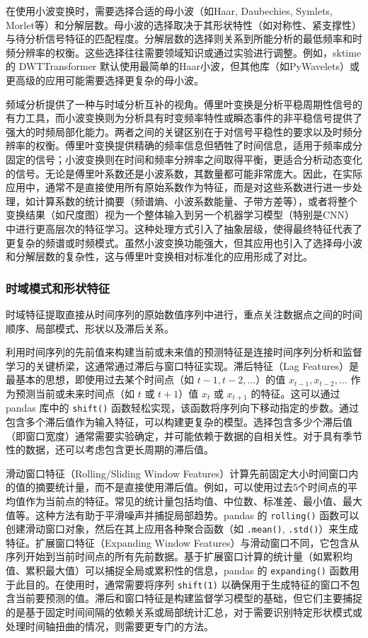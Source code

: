 在使用小波变换时，需要选择合适的母小波（如Haar, Daubechies, Symlets, Morlet等）和分解层数。母小波的选择取决于其形状特性（如对称性、紧支撑性）与待分析信号特征的匹配程度。分解层数的选择则关系到所能分析的最低频率和时频分辨率的权衡。这些选择往往需要领域知识或通过实验进行调整。例如，sktime 的 DWTTransformer 默认使用最简单的Haar小波，但其他库（如PyWavelets）或更高级的应用可能需要选择更复杂的母小波。

频域分析提供了一种与时域分析互补的视角。傅里叶变换是分析平稳周期性信号的有力工具，而小波变换则为分析具有时变频率特性或瞬态事件的非平稳信号提供了强大的时频局部化能力。两者之间的关键区别在于对信号平稳性的要求以及时频分辨率的权衡。傅里叶变换提供精确的频率信息但牺牲了时间信息，适用于频率成分固定的信号；小波变换则在时间和频率分辨率之间取得平衡，更适合分析动态变化的信号。无论是傅里叶系数还是小波系数，其数量都可能非常庞大。因此，在实际应用中，通常不是直接使用所有原始系数作为特征，而是对这些系数进行进一步处理，如计算系数的统计摘要（频谱熵、小波系数能量、子带方差等），或者将整个变换结果（如尺度图）视为一个整体输入到另一个机器学习模型（特别是CNN）中进行更高层次的特征学习。这种处理方式引入了抽象层级，使得最终特征代表了更复杂的频谱或时频模式。虽然小波变换功能强大，但其应用也引入了选择母小波和分解层数的复杂性，这与傅里叶变换相对标准化的应用形成了对比。

        \subsubsection{时域模式和形状特征}
            \label{sec:ts_subsequence_pattern}
            时域特征提取直接从时间序列的原始数值序列中进行，重点关注数据点之间的时间顺序、局部模式、形状以及滞后关系。

            利用时间序列的先前值来构建当前或未来值的预测特征是连接时间序列分析和监督学习的关键桥梁，这通常通过滞后与窗口特征实现。滞后特征（Lag Features）是最基本的思想，即使用过去某个时间点（如 $t-1, t-2, \dots$）的值 $x_{t-1}, x_{t-2}, \dots$ 作为预测当前或未来时间点（如 $t$ 或 $t+1$）值 $x_t$ 或 $x_{t+1}$ 的特征。这可以通过 pandas 库中的 \texttt{shift()} 函数轻松实现，该函数将序列向下移动指定的步数。通过包含多个滞后值作为输入特征，可以构建更复杂的模型。选择包含多少个滞后值（即窗口宽度）通常需要实验确定，并可能依赖于数据的自相关性。对于具有季节性的数据，还可以考虑包含更长周期的滞后值。
            
            滑动窗口特征（Rolling/Sliding Window Features）计算先前固定大小时间窗口内的值的摘要统计量，而不是直接使用滞后值。例如，可以使用过去5个时间点的平均值作为当前点的特征。常见的统计量包括均值、中位数、标准差、最小值、最大值等。这种方法有助于平滑噪声并捕捉局部趋势。pandas 的 \texttt{rolling()} 函数可以创建滑动窗口对象，然后在其上应用各种聚合函数（如 \texttt{.mean()}, \texttt{.std()}）来生成特征。扩展窗口特征（Expanding Window Features）与滑动窗口不同，它包含从序列开始到当前时间点的所有先前数据。基于扩展窗口计算的统计量（如累积均值、累积最大值）可以捕捉全局或累积性的信息，pandas 的 \texttt{expanding()} 函数用于此目的。在使用时，通常需要将序列 \texttt{shift(1)} 以确保用于生成特征的窗口不包含当前要预测的值。滞后和窗口特征是构建监督学习模型的基础，但它们主要捕捉的是基于固定时间间隔的依赖关系或局部统计汇总，对于需要识别特定形状模式或处理时间轴扭曲的情况，则需要更专门的方法。
            
